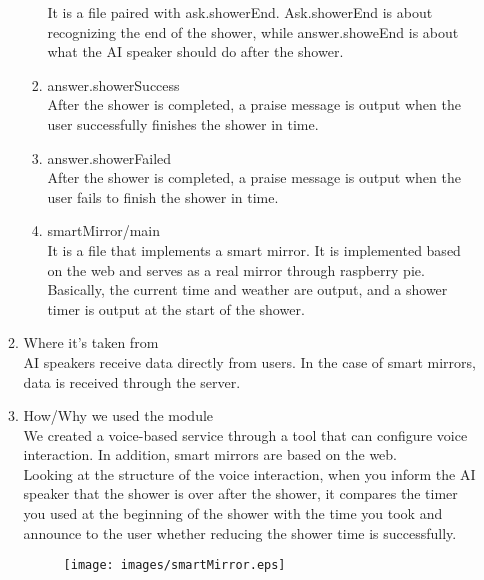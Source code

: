 \documentclass[11pt, conference]{IEEEtran}
\begin{document}
\begin{enumerate}[label=\arabic*]
\begin{enumerate}[label=\alph*]
\begin{enumerate}
            It is a file paired with ask.showerEnd. Ask.showerEnd is about recognizing the end of the shower, while answer.showeEnd is about what the AI speaker should do after the shower.
            \item answer.showerSuccess\\
            After the shower is completed, a praise message is output when the user successfully finishes the shower in time.
            \item answer.showerFailed\\
            After the shower is completed, a praise message is output when the user fails to finish the shower in time.
            \item smartMirror/main\\
            It is a file that implements a smart mirror. It is implemented based on the web and serves as a real mirror through raspberry pie. Basically, the current time and weather are output, and a shower timer is output at the start of the shower.\\
        \end{enumerate}
        \item Where it's taken from\\
        AI speakers receive data directly from users. In the case of smart mirrors, data is received through the server.\\
        \item How/Why we used the module\\
        We created a voice-based service through a tool that can configure voice interaction. In addition, smart mirrors are based on the web.\\
        Looking at the structure of the voice interaction, when you inform the AI speaker that the shower is over after the shower, it compares the timer you used at the beginning of the shower with the time you took and announce to the user whether reducing the shower time is successfully.
    \begin{figure}[H]
        \centering
        \texttt{[image: images/smartMirror.eps]}
    \end{figure}
    \end{enumerate}
\end{enumerate}
\end{document}
